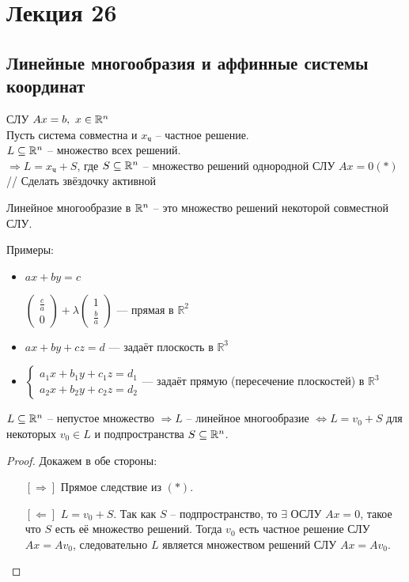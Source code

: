 \section*{Лекция 26}
%
\subsection*{Линейные многообразия и аффинные системы координат}
\raggedright{ СЛУ $Ax = b,~ x \in \mathbb{R}^n$} \\
Пусть система совместна и $x_\text{ч}$ -- частное решение. \\
$L \subseteq \mathbb{R}^n$ -- множество всех решений. \\ 
$\Rightarrow L = x_\text{ч} + S$, где $S \subseteq \mathbb{R}^n$ -- множество решений однородной СЛУ $Ax = 0 (*)$ // Сделать звёздочку активной

\begin{Def}
	Линейное многообразие в $\mathbb{R}^n$ -- это множество решений некоторой совместной СЛУ.
\end{Def}

Примеры:
\begin{itemize}
    \item $ax+by=c$ 
    
    $\begin{pmatrix}
    \frac c a \\ 0
    \end{pmatrix} + \lambda
    \begin{pmatrix}
    1 \\ \frac b a
    \end{pmatrix}$ --- прямая в $\mathbb{R}^2$
    \item $ax+by+cz=d$ --- задаёт плоскость в $\mathbb{R}^3$
    \item $\begin{cases}
            a_1x+b_1y+c_1z=d_1\\
            a_2x+b_2y+c_2z=d_2
        \end{cases}$--- задаёт прямую (пересечение плоскостей) в $\mathbb{R}^3$
\end{itemize}

\begin{Suggestion}
	$L \subseteq \mathbb{R}^n$ -- непустое множество $\Rightarrow L$ -- линейное многообразие $\Leftrightarrow L = v_0 + S$ для некоторых $v_0 \in L$
	 и подпространства $S \subseteq \mathbb{R}^n$.  
\end{Suggestion}
\begin{proof}
	Докажем в обе стороны:
	\begin{enumerate}
		\item[{$[\Rightarrow]$}] Прямое следствие из $(*)$. \\
		\item[{$[\Leftarrow]$}] $L = v_0 + S$. Так как $S$ -- подпространство, то $\exists$ ОСЛУ $Ax = 0$, такое что $S$ есть её множество решений. Тогда
		$v_0$ есть частное решение СЛУ $Ax = Av_0$, следовательно $L$ является множеством решений  СЛУ $Ax = Av_0$.
	\end{enumerate}
\end{proof}

